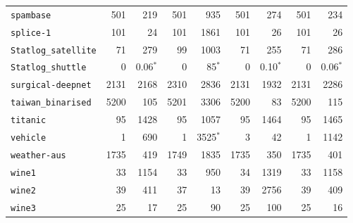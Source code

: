 \begin{tabular}{lrrrrrrrr}
\texttt{spambase} & 501 & 219 & 501 & 935 & 501 & 274 & 501 & 234\\
\texttt{splice-1} & 101 & 24 & 101 & 1861 & 101 & 26 & 101 & 26\\
\texttt{Statlog\_satellite} & 71 & 279 & 99 & 1003 & 71 & 255 & 71 & 286\\
\texttt{Statlog\_shuttle} & 0 & 0.06$^*$ & 0 & 85$^*$ & 0 & 0.10$^*$ & 0 & 0.06$^*$\\
\texttt{surgical-deepnet} & 2131 & 2168 & 2310 & 2836 & 2131 & 1932 & 2131 & 2286\\
\texttt{taiwan\_binarised} & 5200 & 105 & 5201 & 3306 & 5200 & 83 & 5200 & 115\\
\texttt{titanic} & 95 & 1428 & 95 & 1057 & 95 & 1464 & 95 & 1465\\
\texttt{vehicle} & 1 & 690 & 1 & 3525$^*$ & 3 & 42 & 1 & 1142\\
\texttt{weather-aus} & 1735 & 419 & 1749 & 1835 & 1735 & 350 & 1735 & 401\\
\texttt{wine1} & 33 & 1154 & 33 & 950 & 34 & 1319 & 33 & 1158\\
\texttt{wine2} & 39 & 411 & 37 & 13 & 39 & 2756 & 39 & 409\\
\texttt{wine3} & 25 & 17 & 25 & 90 & 25 & 100 & 25 & 16\\
\bottomrule
\end{tabular}
